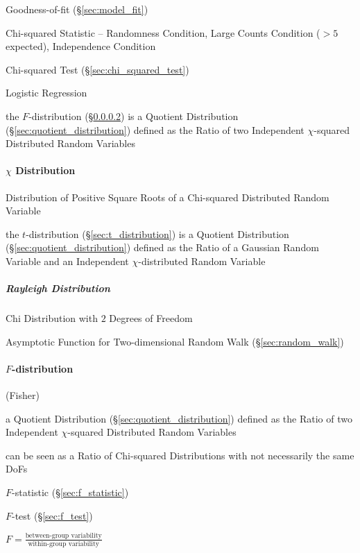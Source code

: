 Goodness-of-fit (\S\ref{sec:model_fit})

Chi-squared Statistic -- Randomness Condition, Large Counts Condition ($>5$
expected), Independence Condition

\fist Chi-squared Test (\S\ref{sec:chi_squared_test})

Logistic Regression

the $F$-distribution (\S\ref{sec:f_distribution}) is a Quotient Distribution
(\S\ref{sec:quotient_distribution}) defined as the Ratio of two Independent
$\chi$-squared Distributed Random Variables



\paragraph{$\chi$ Distribution}\label{sec:chi_distribution}\hfill

Distribution of Positive Square Roots of a Chi-squared Distributed Random
Variable

the $t$-distribution (\S\ref{sec:t_distribution}) is a Quotient Distribution
(\S\ref{sec:quotient_distribution}) defined as the Ratio of a Gaussian Random
Variable and an Independent $\chi$-distributed Random Variable



\subparagraph{Rayleigh Distribution}\label{sec:rayleigh_distribution}\hfill

Chi Distribution with $2$ Degrees of Freedom

Asymptotic Function for Two-dimensional Random Walk (\S\ref{sec:random_walk})



\paragraph{$F$-distribution}\label{sec:f_distribution}\hfill

(Fisher)

a Quotient Distribution (\S\ref{sec:quotient_distribution}) defined as the Ratio
of two Independent $\chi$-squared Distributed Random Variables

can be seen as a Ratio of Chi-squared Distributions with not necessarily the
same DoFs

$F$-statistic (\S\ref{sec:f_statistic})

$F$-test (\S\ref{sec:f_test})

$F = \frac{\text{between-group variability}}{\text{within-group variability}}$


